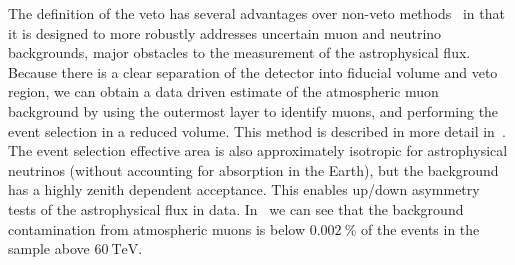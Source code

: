 The definition of the veto has several advantages over non-veto methods~\cite{Niederhausen:2017mjk,Stettner:2019tok} in that it is designed to more robustly addresses uncertain muon and neutrino backgrounds, major obstacles to the measurement of the astrophysical flux.
Because there is a clear separation of the detector into fiducial volume and veto region, we can obtain a data driven estimate of the atmospheric muon background by using the outermost layer to identify muons, and performing the event selection in a reduced volume.
This method is described in more detail in~.
The event selection effective area is also approximately isotropic for astrophysical neutrinos (without accounting for absorption in the Earth), but the background has a highly zenith dependent acceptance.
This enables up/down asymmetry tests of the astrophysical flux in data.
In~ we can see that the background contamination from atmospheric muons is below $\SI{0.002}\percent$ of the events in the sample above $\SI{60}\TeV$.

